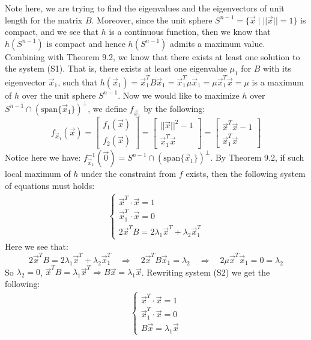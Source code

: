 \documentclass[11pt,oneside]{book}
\theoremstyle{break}
\theoremstyle{break}
\newcommand{\spa}{\text{span}}
\begin{document}
Note here, we are trying to find the eigenvalues and the eigenvectors of unit length for the matrix $B$. Moreover, since the unit sphere $S^{n-1} = \{\vec{x}\mid ||\vec{x}|| = 1\}$ is compact, and we see that $h$ is a continuous function, then we know that $h(S^{n-1})$ is compact and hence $h(S^{n-1})$ admits a maximum value. Combining with Theorem 9.2, we know that there exists at least one solution to the system (S1). That is, there exists at least one eigenvalue $\mu_1$ for $B$ with its eigenvector $\vec{x}_1$, such that $h(\vec{x}_1) = \vec{x}_1^TB\vec{x}_1 = \vec{x}_1^T\mu\vec{x}_1 = \mu\vec{x}_1^T\vec{x}=\mu$ is a maximum of $h$ over the unit sphere $S^{n-1}$. Now we would like to maximize $h$ over $S^{n-1}\cap (\spa\{ \vec{x}_1\})^\perp$, we define $f_{\vec{x}_1}$ by the following:
$$f_{\vec{x}_1}(\vec{x}) =\begin{bmatrix}
 f_1(\vec{x}) \\ f_2(\vec{x})
\end{bmatrix} = \begin{bmatrix}
||\vec{x}||^2 - 1 \\ \vec{x}_1^T\vec{x}
\end{bmatrix} = \begin{bmatrix}
\vec{x}^T\vec{x}-1 \\ \vec{x}_1^T\vec{x}
\end{bmatrix}$$
Notice here we have: $f_{\vec{x}_1}^{-1}(\vec{0}) = S^{n-1}\cap (\spa\{ \vec{x}_1\})^\perp$.
By Theorem 9.2, if such local maximum of $h$ under the constraint from $f$ exists, then the following system of equations must holds:
\begin{align*}
\begin{cases}
\vec{x}^T \cdot \vec{x} = 1\\
\vec{x}_1^T\cdot \vec{x} = 0\\
2\vec{x}^TB = 2\lambda_1 \vec{x}^T + \lambda_2 \vec{x}_1^T 
\end{cases} \tag{S2}
\end{align*}
Here we see that:
$$2\vec{x}^TB = 2\lambda_1 \vec{x}^T + \lambda_2 \vec{x}_1^T \quad \Rightarrow\quad 2\vec{x}^T B \vec{x}_1 = \lambda_2 \quad \Rightarrow\quad 2\mu\vec{x}^T\vec{x}_1 = 0 = \lambda_2$$
So $\lambda_2 = 0$, $\vec{x}^TB = \lambda_1 \vec{x}^T \Rightarrow B\vec{x} = \lambda_1 \vec{x}$. Rewriting system (S2) we get the following:
\begin{align*}
\begin{cases}
\vec{x}^T \cdot \vec{x} = 1\\
\vec{x}_1^T\cdot \vec{x} = 0\\
B\vec{x} = \lambda_1 \vec{x}
\end{cases} \tag{S3}
\end{align*}
\end{document}
